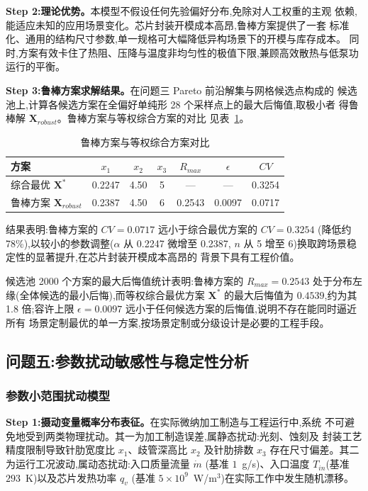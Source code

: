 \textbf{Step 2:理论优势。}本模型不假设任何先验偏好分布,免除对人工权重的主观
依赖,能适应未知的应用场景变化。芯片封装开模成本高昂,鲁棒方案提供了一套
标准化、通用的结构尺寸参数,单一规格可大幅降低异构场景下的开模与库存成本。
同时,方案有效卡住了热阻、压降与温度非均匀性的极值下限,兼顾高效散热与低泵功
运行的平衡。

\textbf{Step 3:鲁棒方案求解结果。}在问题三 Pareto 前沿解集与网格候选点构成的
候选池上,计算各候选方案在全偏好单纯形 28 个采样点上的最大后悔值,取极小者
得鲁棒解 $\mathbf{X}_{robust}$。鲁棒方案与等权综合方案的对比
见表~\ref{tab:robust}。

\begin{table}[htbp]
  \centering
  \caption{鲁棒方案与等权综合方案对比}
  \label{tab:robust}
  \begin{tabular}{lcccccc}
    \toprule
    方案                         & $x_1$  & $x_2$ & $x_3$ & $R_{max}$ & $\epsilon$ & $CV$   \\
    \midrule
    综合最优 $\mathbf{X}^*$        & 0.2247 & 4.50  & 5     & —         & —          & 0.3254 \\
    鲁棒方案 $\mathbf{X}_{robust}$ & 0.2387 & 4.50  & 6     & 0.2543    & 0.0097     & 0.0717 \\
    \bottomrule
  \end{tabular}
\end{table}

结果表明:鲁棒方案的 $CV=0.0717$ 远小于综合最优方案的 $CV=0.3254$
(降低约 78\%),以较小的参数调整($\alpha$ 从 0.2247 微增至 0.2387,
$n$ 从 5 增至 6)换取跨场景稳定性的显著提升,在芯片封装开模成本高昂的
背景下具有工程价值。

候选池 2000 个方案的最大后悔值统计表明:鲁棒方案的
$R_{max}=0.2543$ 处于分布左缘(全体候选的最小后悔),而等权综合最优方案
$\mathbf{X}^*$ 的最大后悔值为 $0.4539$,约为其 1.8 倍;容许上限
$\epsilon=0.0097$ 远小于任何候选方案的后悔值,说明不存在能同时逼近所有
场景定制最优的单一方案,按场景定制或分级设计是必要的工程手段。

\subsection{问题五:参数扰动敏感性与稳定性分析}

\subsubsection{参数小范围扰动模型}

\textbf{Step 1:摄动变量概率分布表征。}在实际微纳加工制造与工程运行中,系统
不可避免地受到两类物理扰动。其一为加工制造误差,属静态扰动:光刻、蚀刻及
封装工艺精度限制导致针肋宽度比 $x_1$、歧管深高比 $x_2$ 及针肋排数 $x_3$
存在尺寸偏差。其二为运行工况波动,属动态扰动:入口质量流量 $\dot{m}$
(基准 $1$~g/s)、入口温度 $T_{in}$(基准 $293$~K)以及芯片发热功率 $q_v$
(基准 $5\times10^9$~W/m$^3$)在实际工作中发生随机漂移。


